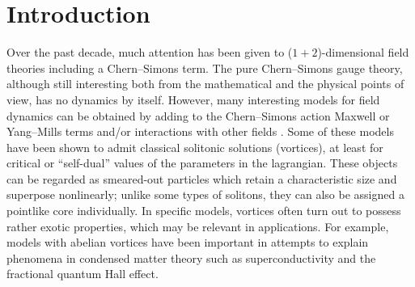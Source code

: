 \documentclass[a4paper,11pt]{article}
\begin{document}
\section{Introduction}


Over the past decade, much attention has been given to 
($1+2$)-dimensional field theories including a Chern--Simons term. 
The pure Chern--Simons gauge theory, although still interesting 
both from the mathematical and the physical points of view, has no 
dynamics by itself. However, many interesting models for field dynamics 
can be obtained by adding to the Chern--Simons action 
Maxwell or Yang--Mills terms and/or 
interactions with other fields \cite{Du}. Some of these models have
been shown to admit classical solitonic solutions (vortices), at least
for critical or ``self-dual'' values of the parameters in the lagrangian.
These objects can be regarded as smeared-out particles which retain a
characteristic size and superpose nonlinearly;
unlike some types of solitons, they can also be assigned a pointlike
core individually. 
In specific models, vortices often turn out to possess
rather exotic properties, which may be relevant in applications.
For example, models with abelian vortices have been important in
attempts to explain phenomena in condensed matter theory such as 
superconductivity and the fractional quantum Hall effect. 
\end{document}
